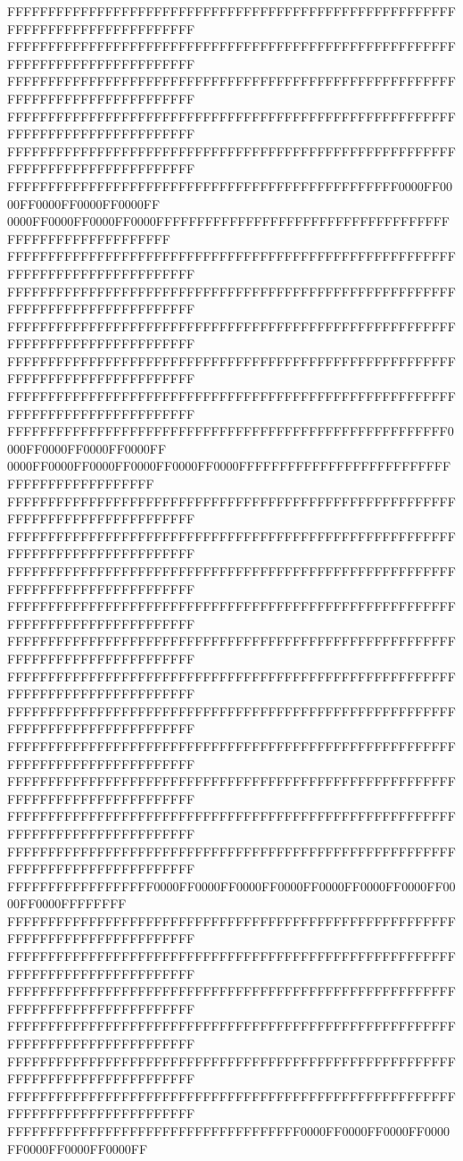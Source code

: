 FFFFFFFFFFFFFFFFFFFFFFFFFFFFFFFFFFFFFFFFFFFFFFFFFFFFFFFFFFFFFFFFFFFFFFFFFFFFFF
FFFFFFFFFFFFFFFFFFFFFFFFFFFFFFFFFFFFFFFFFFFFFFFFFFFFFFFFFFFFFFFFFFFFFFFFFFFFFF
FFFFFFFFFFFFFFFFFFFFFFFFFFFFFFFFFFFFFFFFFFFFFFFFFFFFFFFFFFFFFFFFFFFFFFFFFFFFFF
FFFFFFFFFFFFFFFFFFFFFFFFFFFFFFFFFFFFFFFFFFFFFFFFFFFFFFFFFFFFFFFFFFFFFFFFFFFFFF
FFFFFFFFFFFFFFFFFFFFFFFFFFFFFFFFFFFFFFFFFFFFFFFFFFFFFFFFFFFFFFFFFFFFFFFFFFFFFF
FFFFFFFFFFFFFFFFFFFFFFFFFFFFFFFFFFFFFFFFFFFFFFFF0000FF0000FF0000FF0000FF0000FF
0000FF0000FF0000FF0000FFFFFFFFFFFFFFFFFFFFFFFFFFFFFFFFFFFFFFFFFFFFFFFFFFFFFFFF
FFFFFFFFFFFFFFFFFFFFFFFFFFFFFFFFFFFFFFFFFFFFFFFFFFFFFFFFFFFFFFFFFFFFFFFFFFFFFF
FFFFFFFFFFFFFFFFFFFFFFFFFFFFFFFFFFFFFFFFFFFFFFFFFFFFFFFFFFFFFFFFFFFFFFFFFFFFFF
FFFFFFFFFFFFFFFFFFFFFFFFFFFFFFFFFFFFFFFFFFFFFFFFFFFFFFFFFFFFFFFFFFFFFFFFFFFFFF
FFFFFFFFFFFFFFFFFFFFFFFFFFFFFFFFFFFFFFFFFFFFFFFFFFFFFFFFFFFFFFFFFFFFFFFFFFFFFF
FFFFFFFFFFFFFFFFFFFFFFFFFFFFFFFFFFFFFFFFFFFFFFFFFFFFFFFFFFFFFFFFFFFFFFFFFFFFFF
FFFFFFFFFFFFFFFFFFFFFFFFFFFFFFFFFFFFFFFFFFFFFFFFFFFFFF0000FF0000FF0000FF0000FF
0000FF0000FF0000FF0000FF0000FF0000FFFFFFFFFFFFFFFFFFFFFFFFFFFFFFFFFFFFFFFFFFFF
FFFFFFFFFFFFFFFFFFFFFFFFFFFFFFFFFFFFFFFFFFFFFFFFFFFFFFFFFFFFFFFFFFFFFFFFFFFFFF
FFFFFFFFFFFFFFFFFFFFFFFFFFFFFFFFFFFFFFFFFFFFFFFFFFFFFFFFFFFFFFFFFFFFFFFFFFFFFF
FFFFFFFFFFFFFFFFFFFFFFFFFFFFFFFFFFFFFFFFFFFFFFFFFFFFFFFFFFFFFFFFFFFFFFFFFFFFFF
FFFFFFFFFFFFFFFFFFFFFFFFFFFFFFFFFFFFFFFFFFFFFFFFFFFFFFFFFFFFFFFFFFFFFFFFFFFFFF
FFFFFFFFFFFFFFFFFFFFFFFFFFFFFFFFFFFFFFFFFFFFFFFFFFFFFFFFFFFFFFFFFFFFFFFFFFFFFF
FFFFFFFFFFFFFFFFFFFFFFFFFFFFFFFFFFFFFFFFFFFFFFFFFFFFFFFFFFFFFFFFFFFFFFFFFFFFFF
FFFFFFFFFFFFFFFFFFFFFFFFFFFFFFFFFFFFFFFFFFFFFFFFFFFFFFFFFFFFFFFFFFFFFFFFFFFFFF
FFFFFFFFFFFFFFFFFFFFFFFFFFFFFFFFFFFFFFFFFFFFFFFFFFFFFFFFFFFFFFFFFFFFFFFFFFFFFF
FFFFFFFFFFFFFFFFFFFFFFFFFFFFFFFFFFFFFFFFFFFFFFFFFFFFFFFFFFFFFFFFFFFFFFFFFFFFFF
FFFFFFFFFFFFFFFFFFFFFFFFFFFFFFFFFFFFFFFFFFFFFFFFFFFFFFFFFFFFFFFFFFFFFFFFFFFFFF
FFFFFFFFFFFFFFFFFFFFFFFFFFFFFFFFFFFFFFFFFFFFFFFFFFFFFFFFFFFFFFFFFFFFFFFFFFFFFF
FFFFFFFFFFFFFFFFFF0000FF0000FF0000FF0000FF0000FF0000FF0000FF0000FF0000FFFFFFFF
FFFFFFFFFFFFFFFFFFFFFFFFFFFFFFFFFFFFFFFFFFFFFFFFFFFFFFFFFFFFFFFFFFFFFFFFFFFFFF
FFFFFFFFFFFFFFFFFFFFFFFFFFFFFFFFFFFFFFFFFFFFFFFFFFFFFFFFFFFFFFFFFFFFFFFFFFFFFF
FFFFFFFFFFFFFFFFFFFFFFFFFFFFFFFFFFFFFFFFFFFFFFFFFFFFFFFFFFFFFFFFFFFFFFFFFFFFFF
FFFFFFFFFFFFFFFFFFFFFFFFFFFFFFFFFFFFFFFFFFFFFFFFFFFFFFFFFFFFFFFFFFFFFFFFFFFFFF
FFFFFFFFFFFFFFFFFFFFFFFFFFFFFFFFFFFFFFFFFFFFFFFFFFFFFFFFFFFFFFFFFFFFFFFFFFFFFF
FFFFFFFFFFFFFFFFFFFFFFFFFFFFFFFFFFFFFFFFFFFFFFFFFFFFFFFFFFFFFFFFFFFFFFFFFFFFFF
FFFFFFFFFFFFFFFFFFFFFFFFFFFFFFFFFFFF0000FF0000FF0000FF0000FF0000FF0000FF0000FF
